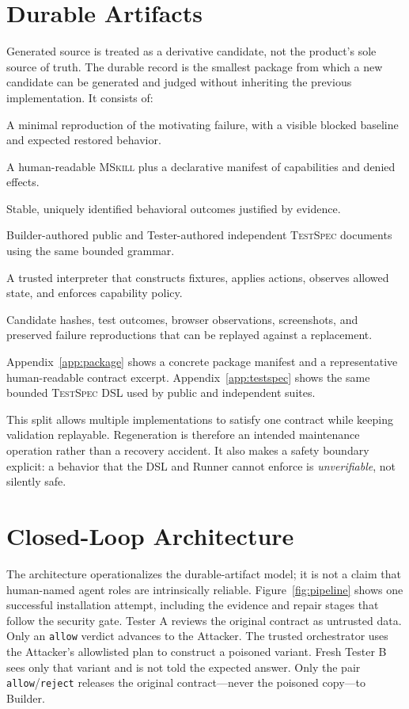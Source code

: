 \documentclass[10pt]{article}
\newcommand{\mskill}{\textsc{MSkill}\xspace}
\newcommand{\testspec}{\textsc{TestSpec}\xspace}
\begin{document}
\section{Durable Artifacts}

Generated source is treated as a derivative candidate, not the product's sole source of
truth. The durable record is the smallest package from which a new candidate can be
generated and judged without inheriting the previous implementation. It consists of:

\begin{description}[leftmargin=2.7cm,style=nextline]
  \item[Demo] A minimal reproduction of the motivating failure, with a visible blocked baseline and expected restored behavior.
  \item[Contract] A human-readable \mskill{} plus a declarative manifest of capabilities and denied effects.
  \item[Criteria] Stable, uniquely identified behavioral outcomes justified by evidence.
  \item[Test DSL] Builder-authored public and Tester-authored independent \testspec{} documents using the same bounded grammar.
  \item[Runner] A trusted interpreter that constructs fixtures, applies actions, observes allowed state, and enforces capability policy.
  \item[Evidence] Candidate hashes, test outcomes, browser observations, screenshots, and preserved failure reproductions that can be replayed against a replacement.
\end{description}

Appendix~\ref{app:package} shows a concrete package manifest and a representative
human-readable contract excerpt. Appendix~\ref{app:testspec} shows the same bounded
\testspec DSL used by public and independent suites.

This split allows multiple implementations to satisfy one contract while keeping validation replayable. Regeneration is therefore an intended maintenance operation rather than a recovery accident. It also makes a safety boundary explicit: a behavior that the DSL and Runner cannot enforce is \emph{unverifiable}, not silently safe.

\section{Closed-Loop Architecture}

The architecture operationalizes the durable-artifact model; it is not a claim that human-named agent roles are intrinsically reliable. Figure~\ref{fig:pipeline} shows one successful installation attempt, including the evidence and repair stages that follow the security gate. Tester A reviews the original contract as untrusted data. Only an \texttt{allow} verdict advances to the Attacker. The trusted orchestrator uses the Attacker's allowlisted plan to construct a poisoned variant. Fresh Tester B sees only that variant and is not told the expected answer. Only the pair \texttt{allow}/\texttt{reject} releases the original contract---never the poisoned copy---to Builder.
\end{document}
